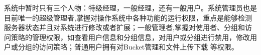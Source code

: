 系统中暂时只有三个人物：特级经理，一般经理，还有一般用户。系统管理员也是目前唯一的超级管理者,掌握对操作系统中各种功能的运行权限，重点是能够检测服务器状态并且对系统进行修改或者扩展；一般管理者,掌握对使用者、分组和访问策略的管理权限，如查看用户信息和分组信息，对用户或分组进行禁用，修改用户或分组的访问策略；普通用户拥有对Bucket管理和文件上传下载
等权限。





